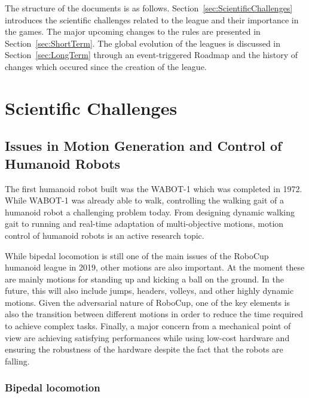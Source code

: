 \documentclass{article}
\begin{document}
The structure of the documents is as
follows. Section~\ref{sec:ScientificChallenges} introduces the scientific
challenges related to the league and their importance in the games. The major
upcoming changes to the rules are presented in Section~\ref{sec:ShortTerm}. The
global evolution of the leagues is discussed in Section~\ref{sec:LongTerm}
through an event-triggered Roadmap and the history of changes which occured
since the creation of the league.

\section{\label{sec:ScientificChallenges}Scientific Challenges}

\subsection{Issues in Motion Generation and Control of Humanoid Robots}

The first humanoid robot built was the WABOT-1 which was completed in 1972. 
While WABOT-1 was already able to walk, controlling the walking gait of a humanoid robot a challenging problem today. 
From designing dynamic walking gait to running and real-time adaptation of multi-objective motions, motion control of humanoid robots is an active research topic.

While bipedal locomotion is still one of the main issues of the RoboCup humanoid
league in 2019, other motions are also important. 
At the moment these are mainly motions for standing up and kicking a ball on the ground.
In the future, this will also include jumps, headers, volleys, and other highly dynamic motions.
Given the adversarial nature of RoboCup, one of the key elements is also the transition between different motions in order to reduce the time required to achieve complex tasks. 
Finally, a major concern from a mechanical point of view are achieving satisfying performances while using low-cost hardware and ensuring the robustness of the hardware despite the fact that the robots are falling.

\subsubsection{Bipedal locomotion}

\end{document}
